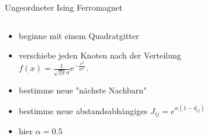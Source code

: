 \documentclass{beamer}
\begin{document}
        \begin{frame}{Ungeordneter Ising Ferromagnet}
            \begin{columns}[t]
                \begin{column}{5cm}
                    \begin{itemize}
                        \item<1-> beginne mit einem Quadratgitter
                        \item<2-> verschiebe jeden Knoten nach der Verteilung\\
                            \(f(x)=\frac{1}{\sqrt{2\pi}\sigma}\mathrm{e}^{-\frac{x^2}{2\sigma^2}}.\){}
                        \item<3-> bestimme neue "nächste Nachbarn"
                        \item<4-> bestimme neue abstandsabhängiges \(J_{ij} = e^{\alpha(1-d_{ij})}\)
                        \item<4-> hier \(\alpha = 0.5\)
                    \end{itemize}
                \end{column}
                \begin{column}{6cm}
                \end{column}
            \end{columns}
        \end{frame}
\end{document}
